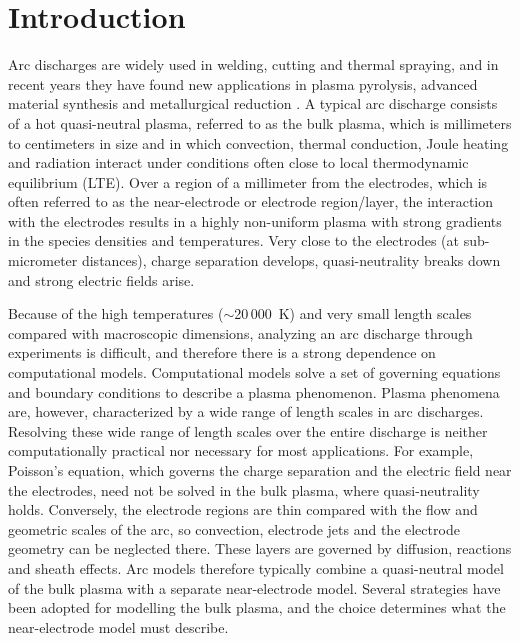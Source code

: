 \section{Introduction}
\label{sec:intro}
Arc discharges are widely used in welding, cutting and thermal spraying, and in recent years they have found new applications in plasma pyrolysis, advanced material synthesis and metallurgical reduction \cite{boulos2023handbook,aghayee2024plasma,zhang2017synthesis,mohanta2026electrical}. A typical arc discharge consists of a hot quasi-neutral plasma, referred to as the bulk plasma, which is millimeters to centimeters in size and in which convection, thermal conduction, Joule heating and radiation interact under conditions often close to local thermodynamic equilibrium (LTE). Over a region of a millimeter from the electrodes, which is often referred to as the near-electrode or electrode region/layer, the interaction with the electrodes results in a highly non-uniform plasma with strong gradients in the species densities and temperatures. Very close to the electrodes (at sub-micrometer distances), charge separation develops, quasi-neutrality breaks down and strong electric fields arise. 

Because of the high temperatures (\(\sim\)20\,000~K) and  very small length scales compared with macroscopic dimensions, analyzing an arc discharge through experiments is difficult, and therefore there is a strong dependence on computational models. Computational models solve a set of governing equations and boundary conditions to describe a plasma phenomenon. Plasma phenomena are, however, characterized by a wide range of length scales in arc discharges. Resolving these wide range of length scales over the entire discharge is neither computationally practical nor necessary for most applications. For example, Poisson's equation, which governs the charge separation and the electric field near the electrodes, need not be solved in the bulk plasma, where quasi-neutrality holds. Conversely, the electrode regions are thin compared with the flow and geometric scales of the arc, so convection, electrode jets and the electrode geometry can be neglected there. These layers are governed by diffusion, reactions and sheath effects. Arc models therefore typically combine a quasi-neutral model of the bulk plasma with a separate near-electrode model. Several strategies have been adopted for modelling the bulk plasma, and the choice determines what the near-electrode model must describe.

